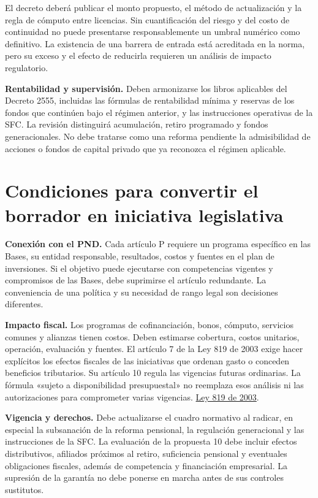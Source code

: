 El decreto deberá publicar el monto propuesto, el método de actualización y la regla de cómputo entre licencias. Sin cuantificación del riesgo y del costo de continuidad no puede presentarse responsablemente un umbral numérico como definitivo. La existencia de una barrera de entrada está acreditada en la norma, pero su exceso y el efecto de reducirla requieren un análisis de impacto regulatorio.

\textbf{Rentabilidad y supervisión.} Deben armonizarse los libros aplicables del Decreto 2555, incluidas las fórmulas de rentabilidad mínima y reservas de los fondos que continúen bajo el régimen anterior, y las instrucciones operativas de la SFC. La revisión distinguirá acumulación, retiro programado y fondos generacionales. No debe tratarse como una reforma pendiente la admisibilidad de acciones o fondos de capital privado que ya reconozca el régimen aplicable.

\section*{Condiciones para convertir el borrador en iniciativa legislativa}

\textbf{Conexión con el PND.} Cada artículo P requiere un programa específico en las Bases, su entidad responsable, resultados, costos y fuentes en el plan de inversiones. Si el objetivo puede ejecutarse con competencias vigentes y compromisos de las Bases, debe suprimirse el artículo redundante. La conveniencia de una política y su necesidad de rango legal son decisiones diferentes.

\textbf{Impacto fiscal.} Los programas de cofinanciación, bonos, cómputo, servicios comunes y alianzas tienen costos. Deben estimarse cobertura, costos unitarios, operación, evaluación y fuentes. El artículo 7 de la Ley 819 de 2003 exige hacer explícitos los efectos fiscales de las iniciativas que ordenan gasto o conceden beneficios tributarios. Su artículo 10 regula las vigencias futuras ordinarias. La fórmula «sujeto a disponibilidad presupuestal» no reemplaza esos análisis ni las autorizaciones para comprometer varias vigencias. \href{https://www1.funcionpublica.gov.co/eva/gestornormativo/norma.php?i=13712}{Ley 819 de 2003}.

\textbf{Vigencia y derechos.} Debe actualizarse el cuadro normativo al radicar, en especial la subsanación de la reforma pensional, la regulación generacional y las instrucciones de la SFC. La evaluación de la propuesta 10 debe incluir efectos distributivos, afiliados próximos al retiro, suficiencia pensional y eventuales obligaciones fiscales, además de competencia y financiación empresarial. La supresión de la garantía no debe ponerse en marcha antes de sus controles sustitutos.

